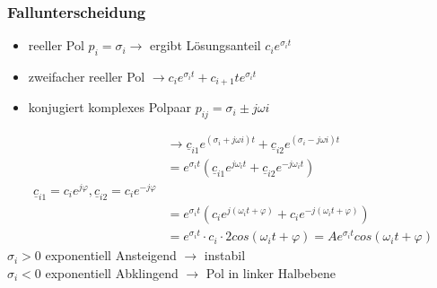 \subsubsection{Fallunterscheidung}
\begin{itemize}
  \item reeller Pol $p_i=\sigma_i \rightarrow$ ergibt Lösungsanteil
  $c_ie^{\sigma_it}$
  \item zweifacher reeller Pol $\rightarrow
  c_ie^{\sigma_it}+c_{i+1}te^{\sigma_it}$
  \item konjugiert komplexes Polpaar $p_{ij}=\sigma_i\pm j\omega i$
\end{itemize}
\begin{align}
  &\rightarrow \underline{c}_{i1}e^{(\sigma_i+j\omega
  i)t}+\underline{c}_{i2}e^{(\sigma_i-j\omega i)t}\nonumber\\
  &=e^{\sigma_it}\left(\underline{c}_{i1}e^{j\omega_it}+\underline{c}_{i2}e^{-j\omega_it}\right)\nonumber\\
  \underline{c}_{i1}=c_ie^{j\varphi},
  \underline{c}_{i2}=c_ie^{-j\varphi}\nonumber\\
  &=e^{\sigma_it}\left(c_ie^{j\left(\omega_it+\varphi\right)}+c_ie^{-j\left(\omega_it+\varphi\right)}\right)\nonumber\\
  &=e^{\sigma_it}\cdot
  c_i\cdot2cos(\omega_it+\varphi)=Ae^{\sigma_it}cos(\omega_it+\varphi)\nonumber
\end{align}
$\sigma_i > 0$ exponentiell Ansteigend $\rightarrow$ instabil\\
$\sigma_i < 0$ exponentiell Abklingend $\rightarrow$ Pol in linker Halbebene\\

